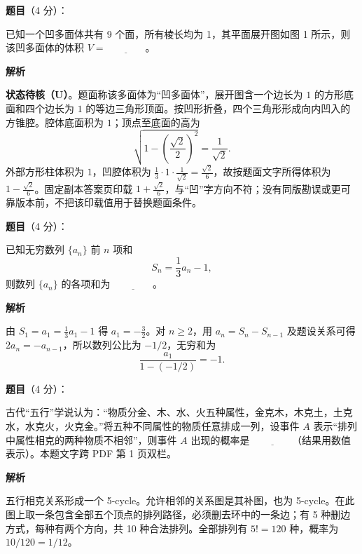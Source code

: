 \begin{answer}

\textbf{题目}（4 分）：

已知一个凹多面体共有 9 个面，所有棱长均为 1，其平面展开图如图 1 所示，则该凹多面体的体积 \(V=\underline{\qquad\qquad}\)。
\nopagebreak[4]
\begin{center}\end{center}
\nopagebreak[4]
\textbf{解析}

\textbf{状态待核（U）}。题面称该多面体为“凹多面体”，展开图含一个边长为 $1$ 的方形底面和四个边长为 $1$ 的等边三角形顶面。按凹形折叠，四个三角形形成向内凹入的方锥腔。腔体底面积为 $1$；顶点至底面的高为
\nopagebreak[4]
\[
\sqrt{1-\left(\frac{\sqrt2}{2}\right)^2}=\frac1{\sqrt2}.
\]
外部方形柱体积为 $1$，凹腔体积为 $\frac13\cdot1\cdot\frac1{\sqrt2}=\frac{\sqrt2}{6}$，故按题面文字所得体积为 $1-\frac{\sqrt2}{6}$。固定副本答案页印载 $1+\frac{\sqrt2}{6}$，与“凹”字方向不符；没有同版勘误或更可靠版本前，不把该印载值用于替换题面条件。


\end{answer}
\begin{answer}

\textbf{题目}（4 分）：

已知无穷数列 \(\{a_n\}\) 前 \(n\) 项和
\nopagebreak[4]
\[
S_n=\frac13a_n-1,
\]
则数列 \(\{a_n\}\) 的各项和为 \(\underline{\qquad\qquad}\)。

\textbf{解析}

由 $S_1=a_1=\frac13a_1-1$ 得 $a_1=-\frac32$。对 $n\ge2$，用 $a_n=S_n-S_{n-1}$ 及题设关系可得 $2a_n=-a_{n-1}$，所以数列公比为 $-1/2$，无穷和为
\nopagebreak[4]
\[
\frac{a_1}{1-(-1/2)}=-1.
\]


\end{answer}
\begin{answer}

\textbf{题目}（4 分）：

古代“五行”学说认为：“物质分金、木、水、火五种属性，金克木，木克土，土克水，水克火，火克金。”将五种不同属性的物质任意排成一列，设事件 \(A\) 表示“排列中属性相克的两种物质不相邻”，则事件 \(A\) 出现的概率是 \(\underline{\qquad\qquad}\)（结果用数值表示）。本题文字跨 PDF 第 1 页双栏。

\textbf{解析}

五行相克关系形成一个 5-cycle。允许相邻的关系图是其补图，也为 5-cycle。在此图上取一条包含全部五个顶点的排列路径，必须删去环中的一条边；有 5 种删边方式，每种有两个方向，共 10 种合法排列。全部排列有 $5!=120$ 种，概率为 $10/120=1/12$。


\end{answer}
